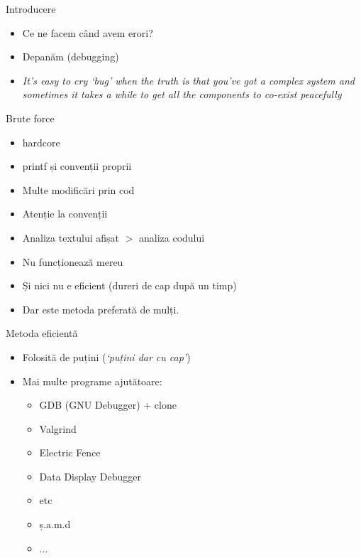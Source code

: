 \documentclass{beamer}
\begin{document}
\begin{frame}{Introducere}
\begin{itemize}
\item Ce ne facem când avem erori?
\item \pause Depanăm (debugging)
\item \pause \textit{It's easy to cry `bug' when the truth is that you've got a complex system and sometimes it takes a while to get all the components to co-exist peacefully}
\end{itemize}
\end{frame}

\begin{frame}{Brute force}
\begin{itemize}
\item hardcore
\item \pause printf și convenții proprii
\item \pause Multe modificări prin cod
\item \pause Atenție la convenții
\item \pause Analiza textului afișat $>$ analiza codului
\item \pause Nu funcționează mereu
\item \pause Și nici nu e eficient \pause(dureri de cap după un timp)
\item \pause Dar este metoda preferată de mulți.
\end{itemize}
\end{frame}

\begin{frame}{Metoda eficientă}
\begin{itemize}
\item Folosită de puțini \pause(\textit{`puțini dar cu cap'})
\item \pause Mai multe programe ajutătoare:
\begin{itemize}
\item GDB (GNU Debugger) + clone
\item Valgrind
\item Electric Fence
\item Data Display Debugger
\item etc
\item ș.a.m.d
\item ...
\end{itemize}
\end{itemize}
\end{frame}
\end{document}
